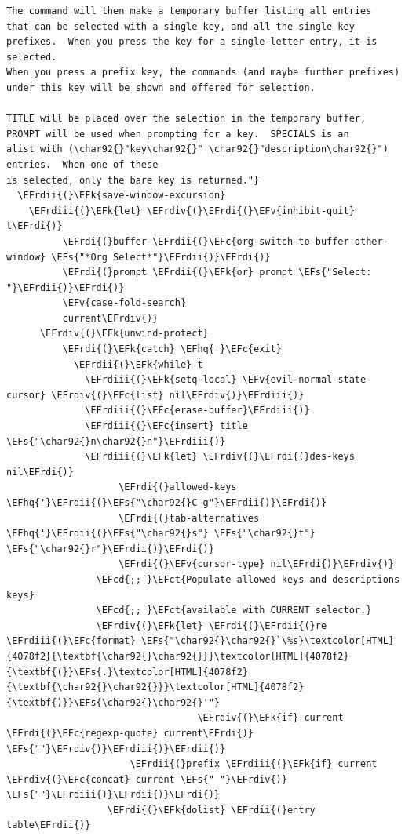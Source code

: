 \documentclass{scrartcl}
\newcommand{\EFk}[1]{\textcolor{EFk}{#1}} %
\newcommand{\EFs}[1]{\textcolor{EFs}{#1}} %
\newcommand{\EFct}[1]{\textcolor{EFct}{#1}} %
\newcommand{\EFc}[1]{\textcolor{EFc}{#1}} %
\newcommand{\EFv}[1]{\textcolor{EFv}{#1}} %
\newcommand{\EFcd}[1]{\textcolor{EFcd}{#1}} %
\newcommand{\EFhq}[1]{\textcolor{EFhq}{#1}} %
\newcommand{\EFrdi}[1]{\textcolor{EFrdi}{#1}} %
\newcommand{\EFrdii}[1]{\textcolor{EFrdii}{#1}} %
\newcommand{\EFrdiii}[1]{\textcolor{EFrdiii}{#1}} %
\newcommand{\EFrdiv}[1]{\textcolor{EFrdiv}{#1}} %
\begin{document}
\begin{Code}
\begin{Verbatim}[]
The command will then make a temporary buffer listing all entries
that can be selected with a single key, and all the single key
prefixes.  When you press the key for a single-letter entry, it is selected.
When you press a prefix key, the commands (and maybe further prefixes)
under this key will be shown and offered for selection.

TITLE will be placed over the selection in the temporary buffer,
PROMPT will be used when prompting for a key.  SPECIALS is an
alist with (\char92{}"key\char92{}" \char92{}"description\char92{}") entries.  When one of these
is selected, only the bare key is returned."}
  \EFrdii{(}\EFk{save-window-excursion}
    \EFrdiii{(}\EFk{let} \EFrdiv{(}\EFrdi{(}\EFv{inhibit-quit} t\EFrdi{)}
          \EFrdi{(}buffer \EFrdii{(}\EFc{org-switch-to-buffer-other-window} \EFs{"*Org Select*"}\EFrdii{)}\EFrdi{)}
          \EFrdi{(}prompt \EFrdii{(}\EFk{or} prompt \EFs{"Select: "}\EFrdii{)}\EFrdi{)}
          \EFv{case-fold-search}
          current\EFrdiv{)}
      \EFrdiv{(}\EFk{unwind-protect}
          \EFrdi{(}\EFk{catch} \EFhq{'}\EFc{exit}
            \EFrdii{(}\EFk{while} t
              \EFrdiii{(}\EFk{setq-local} \EFv{evil-normal-state-cursor} \EFrdiv{(}\EFc{list} nil\EFrdiv{)}\EFrdiii{)}
              \EFrdiii{(}\EFc{erase-buffer}\EFrdiii{)}
              \EFrdiii{(}\EFc{insert} title \EFs{"\char92{}n\char92{}n"}\EFrdiii{)}
              \EFrdiii{(}\EFk{let} \EFrdiv{(}\EFrdi{(}des-keys nil\EFrdi{)}
                    \EFrdi{(}allowed-keys \EFhq{'}\EFrdii{(}\EFs{"\char92{}C-g"}\EFrdii{)}\EFrdi{)}
                    \EFrdi{(}tab-alternatives \EFhq{'}\EFrdii{(}\EFs{"\char92{}s"} \EFs{"\char92{}t"} \EFs{"\char92{}r"}\EFrdii{)}\EFrdi{)}
                    \EFrdi{(}\EFv{cursor-type} nil\EFrdi{)}\EFrdiv{)}
                \EFcd{;; }\EFct{Populate allowed keys and descriptions keys}
                \EFcd{;; }\EFct{available with CURRENT selector.}
                \EFrdiv{(}\EFk{let} \EFrdi{(}\EFrdii{(}re \EFrdiii{(}\EFc{format} \EFs{"\char92{}\char92{}`\%s}\textcolor[HTML]{4078f2}{\textbf{\char92{}\char92{}}}\textcolor[HTML]{4078f2}{\textbf{(}}\EFs{.}\textcolor[HTML]{4078f2}{\textbf{\char92{}\char92{}}}\textcolor[HTML]{4078f2}{\textbf{)}}\EFs{\char92{}\char92{}'"}
                                  \EFrdiv{(}\EFk{if} current \EFrdi{(}\EFc{regexp-quote} current\EFrdi{)} \EFs{""}\EFrdiv{)}\EFrdiii{)}\EFrdii{)}
                      \EFrdii{(}prefix \EFrdiii{(}\EFk{if} current \EFrdiv{(}\EFc{concat} current \EFs{" "}\EFrdiv{)} \EFs{""}\EFrdiii{)}\EFrdii{)}\EFrdi{)}
                  \EFrdi{(}\EFk{dolist} \EFrdii{(}entry table\EFrdii{)}

\end{Verbatim}
\end{Code}
\end{document}
